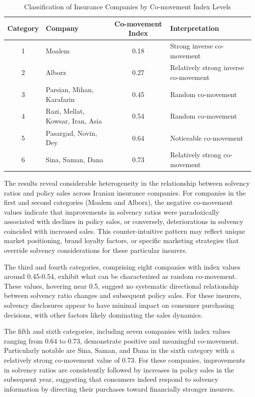 \documentclass[twoside]{article}
\begin{document}
\begin{table}[h]
\centering
\caption{Classification of Insurance Companies by Co-movement Index Levels}
\label{tab:classification}
\small
\begin{tabular}{|c|l|c|l|}
\hline
\textbf{Category} & \textbf{Company} & \textbf{Co-movement Index} & \textbf{Interpretation} \\
\hline
1 & Moalem & 0.18 & Strong inverse co-movement \\
\hline
2 & Alborz & 0.27 & Relatively strong inverse co-movement \\
\hline
3 & Parsian, Mihan, Karafarin & 0.45 & Random co-movement \\
\hline
4 & Razi, Mellat, Kowsar, Iran, Asia & 0.54 & Random co-movement \\
\hline
5 & Pasargad, Novin, Dey & 0.64 & Noticeable co-movement \\
\hline
6 & Sina, Saman, Dana & 0.73 & Relatively strong co-movement \\
\hline
\end{tabular}
\end{table}

The results reveal considerable heterogeneity in the relationship between solvency ratios and policy sales across Iranian insurance companies. For companies in the first and second categories (Moalem and Alborz), the negative co-movement values indicate that improvements in solvency ratios were paradoxically associated with declines in policy sales, or conversely, deteriorations in solvency coincided with increased sales. This counter-intuitive pattern may reflect unique market positioning, brand loyalty factors, or specific marketing strategies that override solvency considerations for these particular insurers.

The third and fourth categories, comprising eight companies with index values around 0.45-0.54, exhibit what can be characterized as random co-movement. These values, hovering near 0.5, suggest no systematic directional relationship between solvency ratio changes and subsequent policy sales. For these insurers, solvency disclosures appear to have minimal impact on consumer purchasing decisions, with other factors likely dominating the sales dynamics.

The fifth and sixth categories, including seven companies with index values ranging from 0.64 to 0.73, demonstrate positive and meaningful co-movement. Particularly notable are Sina, Saman, and Dana in the sixth category with a relatively strong co-movement value of 0.73. For these companies, improvements in solvency ratios are consistently followed by increases in policy sales in the subsequent year, suggesting that consumers indeed respond to solvency information by directing their purchases toward financially stronger insurers.
\end{document}
